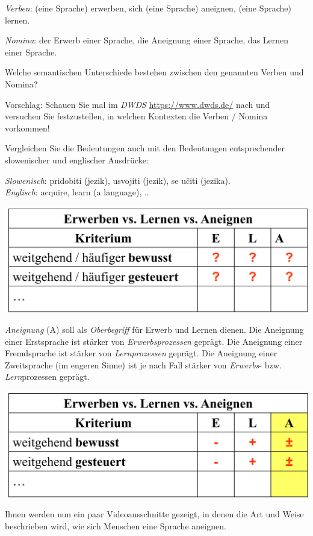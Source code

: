 \documentclass[
  letterpaper,
]{scrbook}
\begin{document}
\emph{Verben}: (eine Sprache) erwerben, sich (eine Sprache) aneignen,
(eine Sprache) lernen.

\emph{Nomina}: der Erwerb einer Sprache, die Aneignung einer Sprache,
das Lernen einer Sprache.

Welche semantischen Unterschiede bestehen zwischen den genannten Verben
und Nomina?

Vorschlag: Schauen Sie mal im \emph{DWDS} \url{https://www.dwds.de/}
nach und versuchen Sie festzustellen, in welchen Kontexten die Verben /
Nomina vorkommen!

Vergleichen Sie die Bedeutungen auch mit den Bedeutungen entsprechender
slowenischer und englischer Ausdrücke:

\emph{Slowenisch}: pridobiti (jezik), usvojiti (jezik), se učiti
(jezika).\\
\emph{Englisch}: acquire, learn (a language), \ldots{}

\includegraphics[width=8.62in,height=\textheight]{./pictures/termini_verben_nomen.png}

\emph{Aneignung} (A) soll als \emph{Oberbegriff} für Erwerb und Lernen
dienen. Die Aneignung einer Erstsprache ist stärker von
\emph{Erwerbsprozessen} geprägt. Die Aneignung einer Fremdsprache ist
stärker von \emph{Lernprozessen} geprägt. Die Aneignung einer
Zweitsprache (im engeren Sinne) ist je nach Fall stärker von
\emph{Erwerbs}- bzw. \emph{Lern}prozessen geprägt.

\includegraphics[width=8.62in,height=\textheight]{./pictures/termini_verben_nomen2.png}

Ihnen werden nun ein paar Videoausschnitte gezeigt, in denen die Art und
Weise beschrieben wird, wie sich Menschen eine Sprache aneignen.
\end{document}
